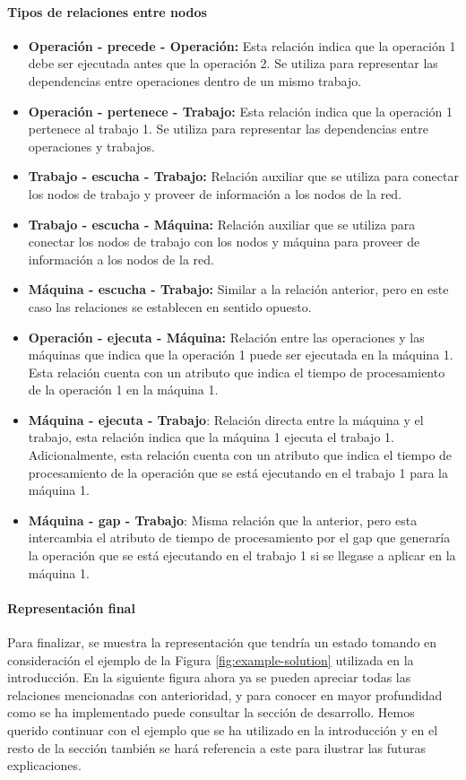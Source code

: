 \paragraph{Tipos de relaciones entre nodos}
\begin{itemize}
    \item \textbf{Operación - precede - Operación:} Esta relación indica que la operación 1 debe ser
    ejecutada antes que la operación 2. Se utiliza para representar las dependencias entre operaciones
    dentro de un mismo trabajo.
    \item \textbf{Operación - pertenece - Trabajo:} Esta relación indica que la operación 1 pertenece
    al trabajo 1. Se utiliza para representar las dependencias entre operaciones y trabajos.
    \item \textbf{Trabajo - escucha - Trabajo:} Relación auxiliar que se utiliza para conectar los
    nodos de trabajo y proveer de información a los nodos de la red.
    \item \textbf{Trabajo - escucha - Máquina:} Relación auxiliar que se utiliza para conectar los
    nodos de trabajo con los nodos y máquina para proveer de información a los nodos de la red.
    \item \textbf{Máquina - escucha - Trabajo:} Similar a la relación anterior, pero en este caso
    las relaciones se establecen en sentido opuesto.
    \item \textbf{Operación - ejecuta - Máquina:} Relación entre las operaciones y las máquinas que indica
    que la operación 1 puede ser ejecutada en la máquina 1. Esta relación cuenta con un atributo que
    indica el tiempo de procesamiento de la operación 1 en la máquina 1.
    \item \textbf{Máquina - ejecuta - Trabajo}: Relación directa entre la máquina y el trabajo, esta
    relación indica que la máquina 1 ejecuta el trabajo 1. Adicionalmente, esta relación cuenta con
    un atributo que indica el tiempo de procesamiento de la operación que se está ejecutando en el
    trabajo 1 para la máquina 1.
    \item \textbf{Máquina - gap - Trabajo}: Misma relación que la anterior, pero esta intercambia el
    atributo de tiempo de procesamiento por el gap que generaría la operación que se está ejecutando
    en el trabajo 1 si se llegase a aplicar en la máquina 1.
\end{itemize}

\paragraph{Representación final}
Para finalizar, se muestra la representación que tendría un estado tomando en consideración el ejemplo 
de la Figura \ref{fig:example-solution} utilizada en la introducción. En la siguiente figura ahora ya 
se pueden apreciar todas las relaciones mencionadas con anterioridad, y para conocer en mayor profundidad
como se ha implementado puede consultar la sección de desarrollo. Hemos querido continuar con el ejemplo
que se ha utilizado en la introducción y en el resto de la sección también se hará referencia a este
para ilustrar las futuras explicaciones. 

